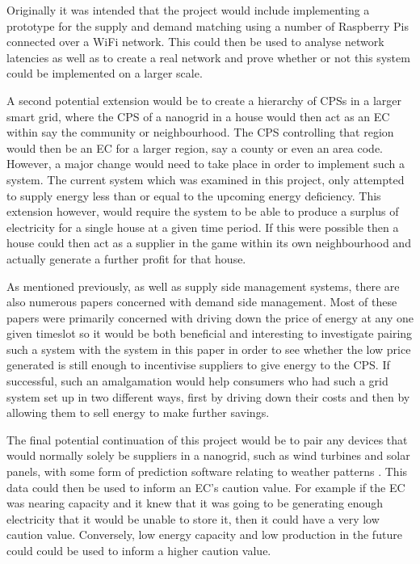 \documentclass[a4paper, notitlepage]{report}
\begin{document}
Originally it was intended that the project would include implementing a
prototype for the supply and demand matching using a number of Raspberry Pis
connected over a WiFi network. This could then be used to analyse network
latencies as well as to create a real network and prove whether or not this
system could be implemented on a larger scale.

A second potential extension would be to create a hierarchy of CPSs in a larger
smart grid, where the CPS of a nanogrid in a house would then act as an EC
within say the community or neighbourhood. The CPS controlling that region would
then be an EC for a larger region, say a county or even an area code. However, a
major change would need to take place in order to implement such a system. The
current system which was examined in this project, only attempted to supply
energy less than or equal to the upcoming energy deficiency. This extension
however, would require the system to be able to produce a surplus of electricity
for a single house at a given time period. If this were possible then a house
could then act as a supplier in the game within its own neighbourhood and
actually generate a further profit for that house.

As mentioned previously, as well as supply side management systems, there are
also numerous papers concerned with demand side management. Most of these papers
were primarily concerned with driving down the price of energy at any one given
timeslot so it would be both beneficial and interesting to investigate pairing
such a system with the system in this paper in order to see whether the low
price generated is still enough to incentivise suppliers to give energy to the
CPS. If successful, such an amalgamation would help consumers who had such a
grid system set up in two different ways, first by driving down their costs and
then by allowing them to sell energy to make further savings.

The final potential continuation of this project would be to pair any devices
that would normally solely be suppliers in a nanogrid, such as wind turbines and
solar panels, with some form of prediction software relating to weather patterns
\cite{foley2012current}. This data could then be used to inform an EC’s caution
value. For example if the EC was nearing capacity and it knew that it was going
to be generating enough electricity that it would be unable to store it, then it
could have a very low caution value. Conversely, low energy capacity and low
production in the future could could be used to inform a higher caution value.
\end{document}
